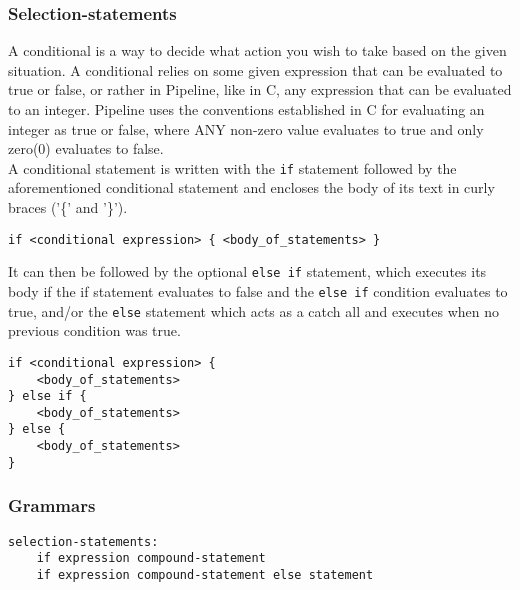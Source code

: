 \documentclass[./LRM_main.tex]{subfiles}
\begin{document}
\subsubsection{Selection-statements}
A conditional is a way to decide what action you wish to take based on the given situation. A conditional relies on some given expression that can be evaluated to true or false, or rather in Pipeline, like in C, any expression that can be evaluated to an integer. Pipeline uses the conventions established in C for evaluating an integer as true or false, where ANY non-zero value evaluates to true and only zero(0) evaluates to false.\\
A conditional statement is written with the \texttt{if} statement followed by the aforementioned conditional statement and encloses the body of its text in curly braces ('\{' and '\}').
\begin{lstlisting}
if <conditional expression> { <body_of_statements> }
\end{lstlisting}
It can then be followed by the optional \texttt{else if} statement, which executes its body if the if statement evaluates to false and the \texttt{else if} condition evaluates to true, and/or the \texttt{else} statement which acts as a catch all and executes when no previous condition was true.
\begin{lstlisting}
if <conditional expression> {
	<body_of_statements>
} else if {
	<body_of_statements>
} else {
	<body_of_statements>
}
\end{lstlisting}
\subsubsection{Grammars}
\begin{lstlisting}
selection-statements:
	if expression compound-statement
	if expression compound-statement else statement
\end{lstlisting}
\end{document}
